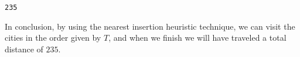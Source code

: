 \documentclass[11pt]{article}
\makeatletter
\newcommand{\boxspacing}{\kern\kvtcb@left@rule\kern\kvtcb@boxsep}
\newcommand{\prompt}[4]{
        \ttfamily\llap{{\color{#2}[#3]:\hspace{3pt}#4}}\vspace{-\baselineskip}
    }
\makeatother
\begin{document}
            \begin{tcolorbox}[breakable, size=fbox, boxrule=.5pt, pad at break*=1mm, opacityfill=0]
\prompt{Out}{outcolor}{46}{\boxspacing}
\begin{Verbatim}[commandchars=\\\{\}]
235
\end{Verbatim}
\end{tcolorbox}
        
    In conclusion, by using the nearest insertion heuristic technique, we
can visit the cities in the order given by \(T\), and when we finish we
will have traveled a total distance of \(235\).


    
    
    
\end{document}
